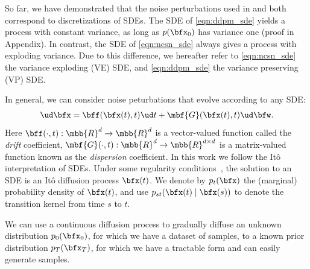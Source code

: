 So far, we have demonstrated that the noise perturbations used in \citet{song2019generative} and \citet{ho2020denoising} both correspond to discretizations of SDEs. The SDE of \cref{eqn:ddpm_sde} yields a process with constant variance, as long as $p(\bfx_0)$ has variance one (proof in Appendix). In contrast, the SDE of \cref{eqn:ncsn_sde} always gives a process with exploding variance. Due to this difference, we hereafter refer to \cref{eqn:ncsn_sde} the variance exploding (VE) SDE, and \cref{eqn:ddpm_sde} the variance preserving (VP) SDE.

In general, we can consider noise peturbations that evolve according to any SDE:
\begin{align}
    \ud \bfx = \bff(\bfx(t), t) \ud t + \mbf{G}(\bfx(t), t) \ud \bfw. \label{eqn:forward_sde}
\end{align}
Here $\bff(\cdot, t): \mbb{R}^d \to \mbb{R}^d$ is a vector-valued function called the \emph{drift} coefficient, $\mbf{G}(\cdot, t): \mbb{R}^d \to \mbb{R}^{d\times d}$ is a matrix-valued function known as the \emph{dispersion} coefficient. %
In this work we follow the It\^{o} interpretation of SDEs. Under some regularity conditions~\citep{oksendal2003stochastic}, the solution to an SDE is an It\^{o} diffusion process $\bfx(t)$. We denote by $p_t(\bfx)$ the (marginal) probability density of $\bfx(t)$, and use $p_{st}(\bfx(t) \mid \bfx(s))$ to denote the transition kernel from time $s$ to $t$.%

We can use a continuous diffusion process to gradually diffuse an unknown distribution $p_0(\bfx_0)$, for which we have a dataset of \iid samples, to a known prior distribution $p_T(\bfx_T)$, for which we have a tractable form and can easily generate samples. 



